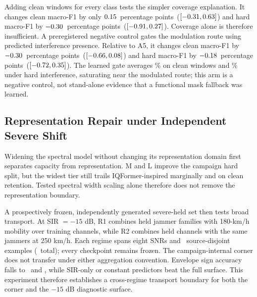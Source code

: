 \documentclass[letterpaper,journal]{IEEEtran}
\newcommand{\pp}{percentage points}
\begin{document}
Adding clean windows for every class tests the simpler coverage explanation.
It changes clean macro-F1 by only $0.15$\ \pp\
($[-0.31,0.63]$) and hard macro-F1 by
$-0.30$\ \pp\ ($[-0.91,0.27]$). Coverage
alone is therefore insufficient. A preregistered negative control gates the
modulation route using predicted interference presence. Relative to A5, it
changes clean macro-F1 by $-0.30$\ \pp\
($[-0.66,0.08]$) and hard
macro-F1 by $-0.18$\ \pp\
($[-0.72,0.35]$). The learned
gate averages \PresenceGateCleanMean\% on clean windows and
\PresenceGateHardMean\% under hard interference, saturating near the modulated
route; this arm is a negative control, not stand-alone evidence
that a functional mask fallback was learned.

\subsection{Representation Repair under Independent Severe Shift}
Widening the spectral model without changing its representation domain first
separates capacity from representation. M and L improve the campaign hard
split, but the widest tier still trails IQFormer-inspired marginally and on
clean retention. Tested spectral width scaling alone therefore does not remove
the representation boundary.

A prospectively frozen, independently generated severe-held set then tests broad
transport. At SIR $=-15$ dB, R1 combines held jammer families with 180-km/h
mobility over training channels, while R2 combines held channels with the same
jammers at 250 km/h. Each regime spans eight SNRs and
\SevereHeldSourcesPerRegime\ source-disjoint examples
(\SevereHeldSourcesTotal\ total); every checkpoint remains frozen. The
campaign-internal corner does not transfer under either aggregation convention.
Envelope sign accuracy falls
to \SevereTransferSignAccIqformer\ and \SevereTransferSignAccMcldnn, while
SIR-only or constant predictors beat the full surface. This experiment
therefore establishes a cross-regime transport boundary for both the corner
and the $-15$ dB diagnostic surface.
\end{document}

